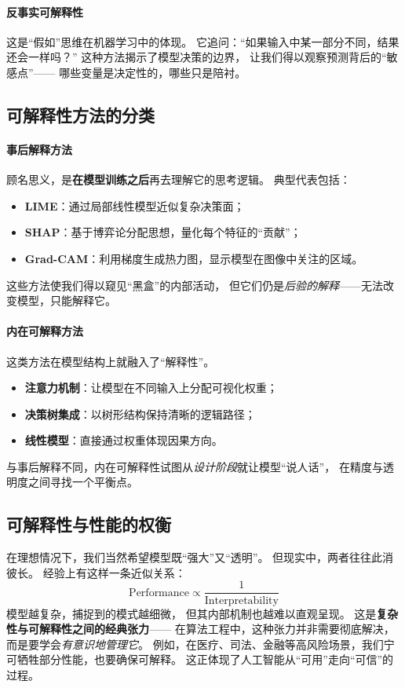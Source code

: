 \paragraph{反事实可解释性}  
这是“假如”思维在机器学习中的体现。  
它追问：“如果输入中某一部分不同，结果还会一样吗？”  
这种方法揭示了模型决策的边界，  
让我们得以观察预测背后的“敏感点”——  
哪些变量是决定性的，哪些只是陪衬。

\subsection{可解释性方法的分类}

\paragraph{事后解释方法}  
顾名思义，是\textbf{在模型训练之后}再去理解它的思考逻辑。  
典型代表包括：  
\begin{itemize}
\item \textbf{LIME}：通过局部线性模型近似复杂决策面；  
\item \textbf{SHAP}：基于博弈论分配思想，量化每个特征的“贡献”；  
\item \textbf{Grad-CAM}：利用梯度生成热力图，显示模型在图像中关注的区域。  
\end{itemize}
这些方法使我们得以窥见“黑盒”的内部活动，  
但它们仍是\textit{后验的解释}——无法改变模型，只能解释它。

\paragraph{内在可解释方法}  
这类方法在模型结构上就融入了“解释性”。  
\begin{itemize}
\item \textbf{注意力机制}：让模型在不同输入上分配可视化权重；  
\item \textbf{决策树集成}：以树形结构保持清晰的逻辑路径；  
\item \textbf{线性模型}：直接通过权重体现因果方向。  
\end{itemize}
与事后解释不同，内在可解释性试图从\textit{设计阶段}就让模型“说人话”，  
在精度与透明度之间寻找一个平衡点。

\subsection{可解释性与性能的权衡}

在理想情况下，我们当然希望模型既“强大”又“透明”。  
但现实中，两者往往此消彼长。  
经验上有这样一条近似关系：  
$$\text{Performance} \propto \frac{1}{\text{Interpretability}}$$  
模型越复杂，捕捉到的模式越细微，  
但其内部机制也越难以直观呈现。  
这是\textbf{复杂性与可解释性之间的经典张力}——  
在算法工程中，这种张力并非需要彻底解决，而是要学会\textit{有意识地管理它}。  
例如，在医疗、司法、金融等高风险场景，我们宁可牺牲部分性能，也要确保可解释。  
这正体现了人工智能从“可用”走向“可信”的过程。

